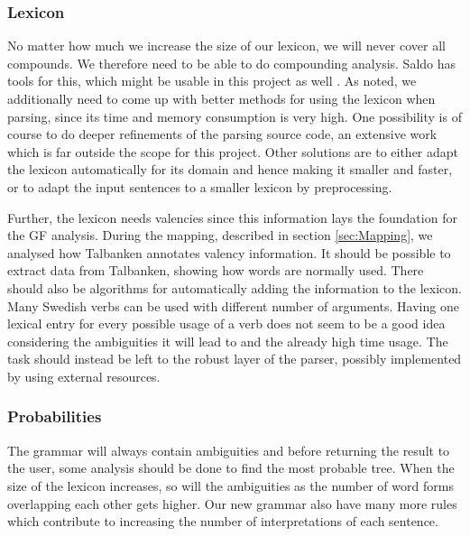 \documentclass{report}
\begin{document}
\subsubsection{Lexicon}
\label{sec:futureValency}
No matter how much we increase the size of our lexicon, we will
never cover all compounds. We therefore need to be able to do
compounding analysis. Saldo has tools for this, which might be usable
in this project as well \cite{fm}.
As noted, we additionally need to come up with better methods for using the lexicon when
parsing, since its time and memory consumption is very high.
One possibility is of course to do 
deeper refinements of the parsing source code, an extensive work which is far
outside the scope for this project. Other solutions are to either
adapt the lexicon automatically for its domain and hence making it smaller and
faster, or to adapt the input sentences to a smaller lexicon by preprocessing.

Further, the lexicon needs valencies since this information lays the
foundation for the GF analysis. 
During the mapping, described in section \ref{sec:Mapping}, we analysed how Talbanken
annotates valency information. It should be possible to %
extract data from Talbanken,
showing how words are normally used. There should also be algorithms for
automatically adding the information to the lexicon. \\
Many Swedish verbs can be used with different number of arguments.
Having one lexical entry for every possible usage of a verb
does not seem to be a good idea considering
the ambiguities it will lead to and the already high time usage.
The task should instead be left to the robust layer of the parser, possibly
implemented by using external resources.




\subsubsection{Probabilities}
\label{sec:futureProbabilities}
The grammar will always contain ambiguities and before returning the result
to the user, some analysis should be done to find the most probable tree.
When the size of the lexicon
increases, so will the ambiguities as the number of word forms overlapping each other
gets higher. Our new grammar also have many more rules which contribute
to increasing the number of interpretations of each sentence.
\end{document}
